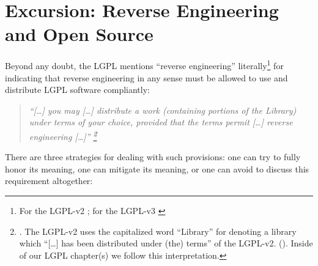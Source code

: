 %
%
%
%
%



\section{Excursion: Reverse Engineering and Open Source}

Beyond any doubt, the LGPL mentions \enquote{reverse engineering}
literally\footnote{For the LGPL-v2 \cite[cf.][\nopage wp.
§6]{Lgpl21OsiLicense1999a}; for the LGPL-v3 \cite[cf.][\nopage wp.
§4]{Lgpl30OsiLicense2007a} } for indicating that reverse engineering in any
sense must be allowed to use and distribute LGPL software compliantly:

\begin{quote}\noindent\emph{\enquote{[\ldots] you may [\ldots] distribute a work
(containing portions of the Library) under terms of your choice, provided that
the terms permit [\ldots] \emph{reverse engineering} [\ldots]}
\footnote{\cite[cf.][\nopage wp, §6]{Lgpl21OsiLicense1999a}. The LGPL-v2 uses
the capitalized word \enquote{Library} for denoting a library which
\enquote{[\ldots] has been distributed under (the) terms} of the LGPL-v2.
(\cite[cf.][\nopage wp, §0]{Lgpl21OsiLicense1999a}). Inside of our LGPL
chapter(s) we follow this interpretation. } }
\end{quote}

There are three strategies for dealing with such provisions: one can try to
fully honor its meaning, one can mitigate its meaning, or one can avoid to
discuss this requirement altogether:

